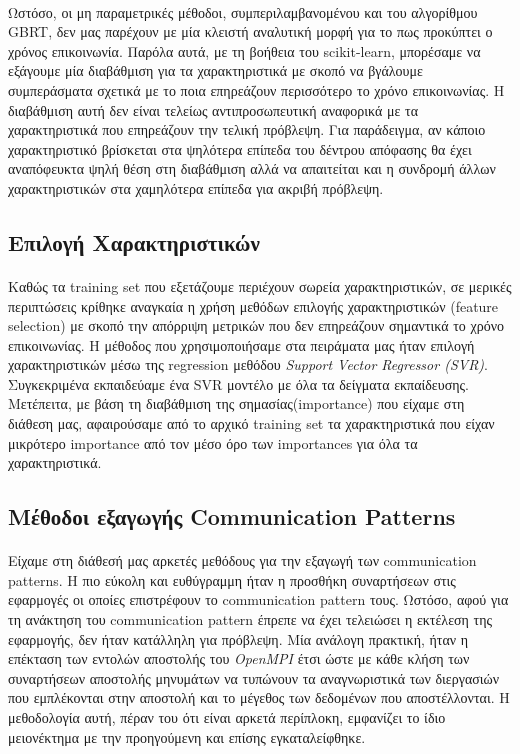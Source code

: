 \paragraph{}
Ωστόσο, οι μη παραμετρικές μέθοδοι, συμπεριλαμβανομένου και του αλγορίθμου GBRT, δεν μας παρέχουν με μία κλειστή αναλυτική μορφή για το πως προκύπτει ο χρόνος επικοινωνία. Παρόλα αυτά, με τη βοήθεια του scikit-learn, μπορέσαμε να εξάγουμε μία διαβάθμιση για τα χαρακτηριστικά με σκοπό να βγάλουμε συμπεράσματα σχετικά με το ποια επηρεάζουν περισσότερο το χρόνο επικοινωνίας. Η διαβάθμιση αυτή δεν είναι τελείως αντιπροσωπευτική αναφορικά με τα χαρακτηριστικά που επηρεάζουν την τελική πρόβλεψη. Για παράδειγμα, αν κάποιο χαρακτηριστικό βρίσκεται στα ψηλότερα επίπεδα του δέντρου απόφασης θα έχει αναπόφευκτα ψηλή θέση στη διαβάθμιση αλλά να απαιτείται και η συνδρομή άλλων χαρακτηριστικών στα χαμηλότερα επίπεδα για ακριβή πρόβλεψη.

\subsection{Επιλογή Χαρακτηριστικών}
\paragraph{}
Καθώς τα training set που εξετάζουμε περιέχουν σωρεία χαρακτηριστικών, σε μερικές περιπτώσεις κρίθηκε αναγκαία η χρήση μεθόδων επιλογής χαρακτηριστικών (feature selection) με σκοπό την απόρριψη μετρικών που δεν επηρεάζουν σημαντικά το χρόνο επικοινωνίας. Η μέθοδος που χρησιμοποιήσαμε στα πειράματα μας ήταν επιλογή χαρακτηριστικών μέσω της regression μεθόδου \textit{Support Vector Regressor (SVR)}. Συγκεκριμένα εκπαιδεύαμε ένα SVR μοντέλο με όλα τα δείγματα εκπαίδευσης. Μετέπειτα, με βάση τη διαβάθμιση της σημασίας(importance) που είχαμε στη διάθεση μας, αφαιρούσαμε από το αρχικό training set τα χαρακτηριστικά που είχαν μικρότερο importance από τον μέσο όρο των importances για όλα τα χαρακτηριστικά.

\subsection{Μέθοδοι εξαγωγής Communication Patterns}
\paragraph{}
Είχαμε στη διάθεσή μας αρκετές μεθόδους για την εξαγωγή των communication patterns. Η πιο εύκολη και ευθύγραμμη ήταν η προσθήκη συναρτήσεων στις εφαρμογές οι οποίες επιστρέφουν το communication pattern τους. Ωστόσο, αφού για τη ανάκτηση του communication pattern έπρεπε να έχει τελειώσει η εκτέλεση της εφαρμογής, δεν ήταν κατάλληλη για πρόβλεψη. Μία ανάλογη πρακτική, ήταν η επέκταση των εντολών αποστολής του \textit{OpenMPI} έτσι ώστε με κάθε κλήση των συναρτήσεων αποστολής μηνυμάτων να τυπώνουν τα αναγνωριστικά των διεργασιών που εμπλέκονται στην αποστολή και το μέγεθος των δεδομένων που αποστέλλονται. Η μεθοδολογία αυτή, πέραν του ότι είναι αρκετά περίπλοκη, εμφανίζει το ίδιο μειονέκτημα με την προηγούμενη και επίσης εγκαταλείφθηκε.

